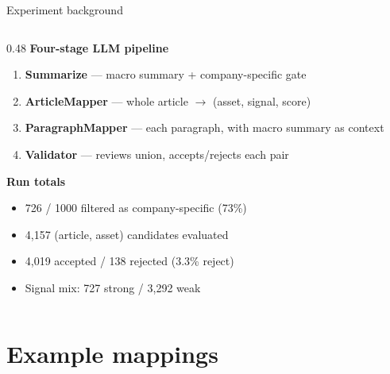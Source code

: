 \documentclass[10pt,aspectratio=169]{beamer}
\begin{document}
\begin{frame}{Experiment background}
\begin{columns}[T,onlytextwidth]
\begin{column}{0.48\textwidth}
      \textbf{Four-stage LLM pipeline}
      \begin{enumerate}\itemsep0.1em
        \item \textbf{Summarize} --- macro summary + company-specific gate
        \item \textbf{ArticleMapper} --- whole article $\rightarrow$ (asset, signal, score)
        \item \textbf{ParagraphMapper} --- each paragraph, with macro summary as context
        \item \textbf{Validator} --- reviews union, accepts/rejects each pair
      \end{enumerate}
      \vspace{0.4em}
      \textbf{Run totals}
      \begin{itemize}\itemsep0.1em
        \item 726 / 1000 filtered as company-specific (73\%)
        \item 4{,}157 (article, asset) candidates evaluated
        \item 4{,}019 accepted / 138 rejected (3.3\% reject)
        \item Signal mix: 727 strong / 3{,}292 weak
      \end{itemize}
    \end{column}
  \end{columns}
\end{frame}

\section{Example mappings}
\end{document}
